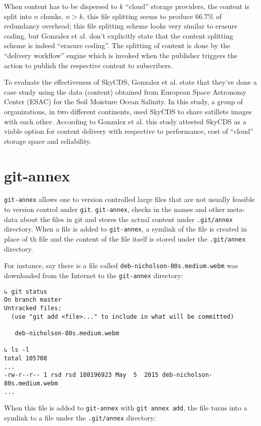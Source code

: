 When content has to be dispersed to $k$ ``cloud'' storage providers,
the content is split into $n$ chunks, $n > k$, this file splitting
seems to produce 66.7\% of redundancy overhead\cite{skycds}; this file
splitting scheme looks very similar to erasure coding, but Gonzalez et
al. don't explicitly state that the content splitting scheme is indeed
``erasure coding''. The splitting of content is done by the ``delivery
workflow'' engine which is invoked when the publisher triggers the
action to publish the respective content to subscribers.

To evaluate the effectiveness of SkyCDS, Gonzalez et al. state that
they've done a case study using the data (content) obtained from
European Space Astronomy Center (ESAC) for the Soil Moisture Ocean
Salinity. In this study, a group of organizations, in two different
continents, used SkyCDS to share satillete images with each
other. According to Gonzalez et al. this study attested SkyCDS as a
viable option for content delivery with respective to performance,
cost of ``cloud'' storage space and reliability.

\section{git-annex}\label{3-gitannex-sec}

\verb+git-annex+ allows one to version controlled large files that are
not usually feasible to version control under
\verb+git+\cite{program:git}. \verb+git-annex+, checks in the names
and other meta-data about the files in git and stores the actual
content under \verb+.git/annex+ directory. When a file is added to
\verb+git-annex+, a symlink of the file is created in place of th file
and the content of the file itself is stored under the
\verb+.git/annex+ directory.

For instance, say there is a file called
\verb+deb-nicholson-80s.medium.webm+ was downloaded from the Internet
to the \verb+git-annex+ directory:

\begin{verbatim}
↳ git status
On branch master
Untracked files:
  (use "git add <file>..." to include in what will be committed)

   deb-nicholson-80s.medium.webm

↳ ls -l
total 105708
...
-rw-r--r-- 1 rsd rsd 108196923 May  5  2015 deb-nicholson-80s.medium.webm
...
\end{verbatim}

When this file is added to \verb+git-annex+ with \verb+git annex add+,
the file turns into a symlink to a file under the \verb+.git/annex+
directory:

